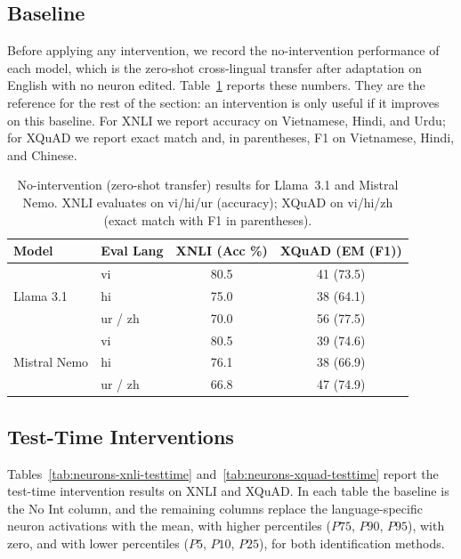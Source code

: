 \subsection{Baseline}
\label{subsec:neurons-baseline}

Before applying any intervention, we record the no-intervention performance of each
model, which is the zero-shot cross-lingual transfer after adaptation on English
with no neuron edited. Table~\ref{tab:neurons-baseline} reports these numbers. They
are the reference for the rest of the section: an intervention is only useful if it
improves on this baseline. For XNLI we report accuracy on Vietnamese, Hindi, and
Urdu; for XQuAD we report exact match and, in parentheses, F1 on Vietnamese, Hindi,
and Chinese.

\begin{table}[ht!]
	\centering
	\renewcommand{\arraystretch}{1.2}
	\begin{tabular}{llcc}
		\toprule
		\textbf{Model} & \textbf{Eval Lang} & \textbf{XNLI (Acc \%)} & \textbf{XQuAD (EM (F1))} \\
		\midrule
		\multirow{3}{*}{Llama 3.1}   & vi      & 80.5 & 41 (73.5) \\
		& hi      & 75.0 & 38 (64.1) \\
		& ur / zh & 70.0 & 56 (77.5) \\
		\midrule
		\multirow{3}{*}{Mistral Nemo} & vi      & 80.5 & 39 (74.6) \\
		& hi      & 76.1 & 38 (66.9) \\
		& ur / zh & 66.8 & 47 (74.9) \\
		\bottomrule
	\end{tabular}
	\caption{No-intervention (zero-shot transfer) results for Llama~3.1 and Mistral Nemo. XNLI evaluates on vi/hi/ur (accuracy); XQuAD on vi/hi/zh (exact match with F1 in parentheses).}
	\label{tab:neurons-baseline}
\end{table}

\subsection{Test-Time Interventions}
\label{subsec:neurons-testtime-results}

Tables~\ref{tab:neurons-xnli-testtime} and~\ref{tab:neurons-xquad-testtime} report
the test-time intervention results on XNLI and XQuAD. In each table the baseline is
the No Int column, and the remaining columns replace the language-specific neuron
activations with the mean, with higher percentiles ($P75$, $P90$, $P95$), with
zero, and with lower percentiles ($P5$, $P10$, $P25$), for both identification
methods.

